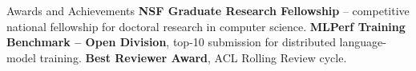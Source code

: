 \begin{rubric}{Awards and Achievements}
\entry*[2024] \textbf{NSF Graduate Research Fellowship} -- competitive national fellowship for doctoral research in computer science.
\entry*[2023] \textbf{MLPerf Training Benchmark -- Open Division}, top-10 submission for distributed language-model training.
\entry*[2022] \textbf{Best Reviewer Award}, ACL Rolling Review cycle.
%


\end{rubric}
